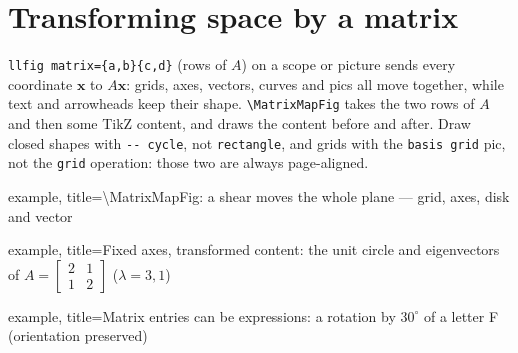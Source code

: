 \documentclass[11pt]{article}
\begin{document}
\section*{Transforming space by a matrix}

\verb|llfig matrix={a,b}{c,d}| (rows of $A$) on a scope or picture sends
every coordinate $\mathbf{x}$ to $A\mathbf{x}$: grids, axes, vectors,
curves and pics all move together, while text and arrowheads keep their
shape. \verb|\MatrixMapFig| takes the two rows of $A$ and then some TikZ
content, and draws the content before and after. Draw closed shapes with \verb|-- cycle|, not
\verb|rectangle|, and grids with the \texttt{basis grid} pic, not the
\texttt{grid} operation: those two are always page-aligned.

\begin{tcblisting}{example, title={\textbackslash MatrixMapFig: a shear
    moves the whole plane --- grid, axes, disk and vector}}
\end{tcblisting}

\begin{tcblisting}{example, title={Fixed axes, transformed content: the
    unit circle and eigenvectors of $A = \left[\begin{smallmatrix} 2 & 1\\
    1 & 2\end{smallmatrix}\right]$ ($\lambda = 3, 1$)}}
\end{tcblisting}

\begin{tcblisting}{example, title={Matrix entries can be expressions: a
    rotation by $30^\circ$ of a letter F (orientation preserved)}}
\end{tcblisting}
\end{document}
